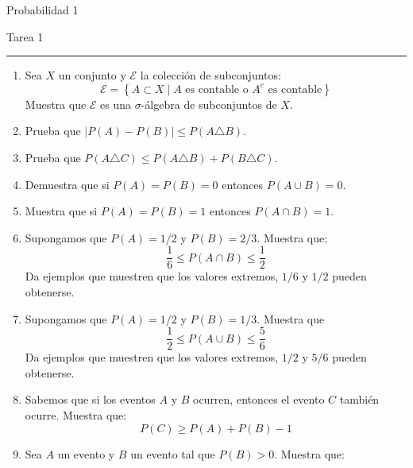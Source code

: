 \documentclass[12pt]{extreport}
\begin{document}
\begin{center}
    \textsf{\Large Probabilidad 1}
    \par\medskip
    \textsf{\large Tarea 1}
    \end{center}
    \hrule
    \par\bigskip

\begin{enumerate}
    \item Sea $X$ un conjunto y $\mathcal{E}$ la colección de subconjuntos:
    $$
    \mathcal{E} = \left\{A\subset X \mid A \text{ es contable o } A^c \text{ es contable}  \right\}
    $$
    Muestra que $\mathcal{E}$ es una $\sigma$-álgebra de subconjuntos de $X$.
    \item Prueba que $\left|P(A)-P(B)\right|\leq P(A\triangle B)$.
    \item Prueba que $P(A\triangle C)\leq P(A\triangle B) + P(B\triangle C)$.
    \item Demuestra que si $P(A) = P(B) = 0 $ entonces $P(A\cup B) = 0$.
    \item Muestra que si $P(A) = P(B) = 1$ entonces $P(A\cap B) = 1$.
    \item Supongamos que $P(A)= 1/2$ y $P(B)= 2/3$. Muestra que:
    $$
    \frac{1}{6} \leq P(A\cap B) \leq \frac{1}{2}
    $$
    Da ejemplos que muestren que los valores extremos, $1/6$ y $1/2$ pueden obtenerse.
    \item Supongamos que $P(A) = 1/2$ y $P(B) = 1/3$. Muestra que
    $$
    \frac{1}{2}\leq P(A\cup B)\leq \frac{5}{6}
    $$
    Da ejemplos que muestren que los valores extremos, $1/2$ y $5/6$ pueden obtenerse.

    \item Sabemos que si los eventos $A$ y $B$ ocurren, entonces el evento $C$ también ocurre. Muestra que:
    $$
    P(C) \geq P(A) + P(B) - 1
    $$ 
    \item Sea $A$ un evento y $B$ un evento tal que $P(B)>0$. Muestra que:
\end{enumerate}
\end{document}
